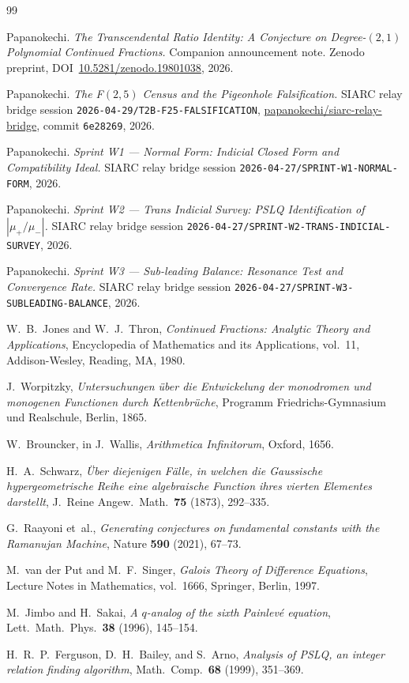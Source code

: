\documentclass[11pt]{amsart}
\theoremstyle{definition}
\theoremstyle{remark}
\begin{document}
\begin{thebibliography}{99}

Papanokechi.
\emph{The Transcendental Ratio Identity: A Conjecture on
Degree-$(2,1)$ Polynomial Continued Fractions.}
Companion announcement note.
Zenodo preprint,
DOI~\href{https://doi.org/10.5281/zenodo.19801038}%
{10.5281/zenodo.19801038}, 2026.

Papanokechi.
\emph{The F$(2,5)$ Census and the Pigeonhole Falsification.}
SIARC relay bridge session
\texttt{2026-04-29/T2B-F25-FALSIFICATION},
\href{https://github.com/papanokechi/siarc-relay-bridge}%
{papanokechi/siarc-relay-bridge}, commit \texttt{6e28269}, 2026.

Papanokechi.
\emph{Sprint W1 --- Normal Form: Indicial Closed Form and
Compatibility Ideal.}
SIARC relay bridge session
\texttt{2026-04-27/SPRINT-W1-NORMAL-FORM}, 2026.

Papanokechi.
\emph{Sprint W2 --- Trans Indicial Survey: PSLQ Identification of
$|\mu_+/\mu_-|$.}
SIARC relay bridge session
\texttt{2026-04-27/SPRINT-W2-TRANS-INDICIAL-SURVEY}, 2026.

Papanokechi.
\emph{Sprint W3 --- Sub-leading Balance: Resonance Test and
Convergence Rate.}
SIARC relay bridge session
\texttt{2026-04-27/SPRINT-W3-SUBLEADING-BALANCE}, 2026.

W.~B.~Jones and W.~J.~Thron,
\emph{Continued Fractions: Analytic Theory and Applications},
Encyclopedia of Mathematics and its Applications, vol.~11,
Addison-Wesley, Reading, MA, 1980.

J.~Worpitzky,
\emph{Untersuchungen \"uber die Entwickelung der monodromen und
monogenen Functionen durch Kettenbr\"uche},
Programm Friedrichs-Gymnasium und Realschule, Berlin, 1865.

W.~Brouncker, in J.~Wallis,
\emph{Arithmetica Infinitorum}, Oxford, 1656.

H.~A.~Schwarz,
\emph{\"Uber diejenigen F\"alle, in welchen die Gauss\-ische
hypergeometrische Reihe eine algebraische Function ihres vierten
Elementes darstellt},
J.\ Reine Angew.\ Math.\ \textbf{75} (1873), 292--335.

G.~Raayoni et~al.,
\emph{Generating conjectures on fundamental constants with the
Ramanujan Machine},
Nature \textbf{590} (2021), 67--73.

M.~van der Put and M.~F.~Singer,
\emph{Galois Theory of Difference Equations},
Lecture Notes in Mathematics, vol.~1666, Springer, Berlin, 1997.

M.~Jimbo and H.~Sakai,
\emph{A $q$-analog of the sixth Painlevé equation},
Lett.\ Math.\ Phys.\ \textbf{38} (1996), 145--154.

H.~R.~P.~Ferguson, D.~H.~Bailey, and S.~Arno,
\emph{Analysis of PSLQ, an integer relation finding algorithm},
Math.\ Comp.\ \textbf{68} (1999), 351--369.

\end{thebibliography}
\end{document}
